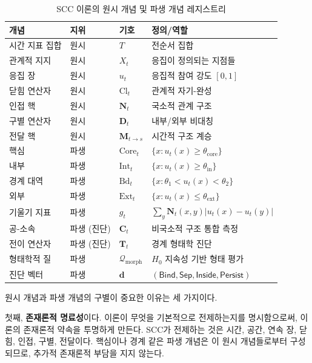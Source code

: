 \begin{table}[ht]
\centering
\caption{SCC 이론의 원시 개념 및 파생 개념 레지스트리}
\label{tab:primitive-derived}
\begin{tabular}{lllp{5.5cm}}
\hline
\textbf{개념} & \textbf{지위} & \textbf{기호} & \textbf{정의/역할} \\
\hline
시간 지표 집합 & 원시 & $T$ & 전순서 집합 \\
관계적 지지 & 원시 & $X_t$ & 응집이 정의되는 지점들 \\
응집 장 & 원시 & $u_t$ & 응집적 참여 강도 $[0,1]$ \\
닫힘 연산자 & 원시 & $\mathrm{Cl}_t$ & 관계적 자기-완성 \\
인접 핵 & 원시 & $\mathbf{N}_t$ & 국소적 관계 구조 \\
구별 연산자 & 원시 & $\mathbf{D}_t$ & 내부/외부 비대칭 \\
전달 핵 & 원시 & $\mathbf{M}_{t \to s}$ & 시간적 구조 계승 \\
\hline
핵심 & 파생 & $\mathrm{Core}_t$ & $\{x : u_t(x) \geq \theta_{\mathrm{core}}\}$ \\
내부 & 파생 & $\mathrm{Int}_t$ & $\{x : u_t(x) \geq \theta_{\mathrm{in}}\}$ \\
경계 대역 & 파생 & $\mathrm{Bd}_t$ & $\{x : \theta_1 < u_t(x) < \theta_2\}$ \\
외부 & 파생 & $\mathrm{Ext}_t$ & $\{x : u_t(x) \leq \theta_{\mathrm{ext}}\}$ \\
기울기 지표 & 파생 & $g_t$ & $\sum_y \mathbf{N}_t(x,y)|u_t(x) - u_t(y)|$ \\
공-소속 & 파생 (진단) & $\mathbf{C}_t$ & 비국소적 구조 통합 측정 \\
전이 연산자 & 파생 (진단) & $\mathbf{T}_t$ & 경계 형태학 진단 \\
형태학적 질 & 파생 & $\mathcal{Q}_{\mathrm{morph}}$ & $H_0$ 지속성 기반 형태 평가 \\
진단 벡터 & 파생 & $\mathbf{d}$ & $(\mathsf{Bind}, \mathsf{Sep}, \mathsf{Inside}, \mathsf{Persist})$ \\
\hline
\end{tabular}
\end{table}

원시 개념과 파생 개념의 구별이 중요한 이유는 세 가지이다.

첫째, \textbf{존재론적 명료성}이다. 이론이 무엇을 기본적으로 전제하는지를 명시함으로써, 이론의 존재론적 약속을 투명하게 만든다. SCC가 전제하는 것은 시간, 공간, 연속 장, 닫힘, 인접, 구별, 전달이다. 핵심이나 경계 같은 파생 개념은 이 원시 개념들로부터 구성되므로, 추가적 존재론적 부담을 지지 않는다.

